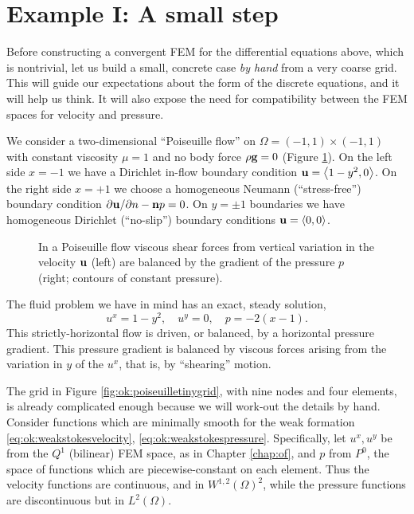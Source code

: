 \section{Example I: A small step}

Before constructing a convergent FEM for the differential equations above, which is nontrivial, let us build a small, concrete case \emph{by hand} from a very coarse grid.  This will guide our expectations about the form of the discrete equations, and it will help us think.  It will also expose the need for compatibility between the FEM spaces for velocity and pressure.

We consider a two-dimensional ``Poiseuille flow'' \citep{Acheson1990,Elmanetal2005} on $\Omega=(-1,1)\times(-1,1)$ with constant viscosity $\mu=1$ and no body force $\rho \mathbf{g}=0$ (Figure \ref{fig:ok:poiseuillesolutions}).  On the left side $x=-1$ we have a Dirichlet in-flow boundary condition $\mathbf{u} = \left<1-y^2,0\right>$.  On the right side $x=+1$ we choose a homogeneous Neumann (``stress-free'') boundary condition $\partial \mathbf{u}/\partial n - \mathbf{n} p = 0$.  On $y=\pm 1$ boundaries we have homogeneous Dirichlet (``no-slip'') boundary conditions $\mathbf{u}=\left<0,0\right>$. 

\begin{figure}

\caption{In a Poiseuille flow viscous shear forces from vertical variation in the velocity $\mathbf{u}$ (left) are balanced by the gradient of the pressure $p$ (right; contours of constant pressure).}
\label{fig:ok:poiseuillesolutions}
\end{figure}

The fluid problem we have in mind has an exact, steady solution,
\begin{equation}
u^x = 1-y^2, \quad u^y=0, \quad p = -2(x-1).  \label{eq:ok:poiseuilleexact}
\end{equation}
This strictly-horizontal flow is driven, or balanced, by a horizontal pressure gradient.  This pressure gradient is balanced by viscous forces arising from the variation in $y$ of the $u^x$, that is, by ``shearing'' motion.

The grid in Figure \ref{fig:ok:poiseuilletinygrid}, with nine nodes and four elements, is already complicated enough because we will work-out the details by hand.  Consider functions which are minimally smooth for the weak formation \eqref{eq:ok:weakstokesvelocity}, \eqref{eq:ok:weakstokespressure}.  Specifically, let $u^x,u^y$ be from the $Q^1$ (bilinear) FEM space, as in Chapter \ref{chap:of}, and $p$ from $P^0$, the space of functions which are piecewise-constant on each element.  Thus the velocity functions are continuous, and in $W^{1,2}(\Omega)^2$, while the pressure functions are discontinuous but in $L^2(\Omega)$.

